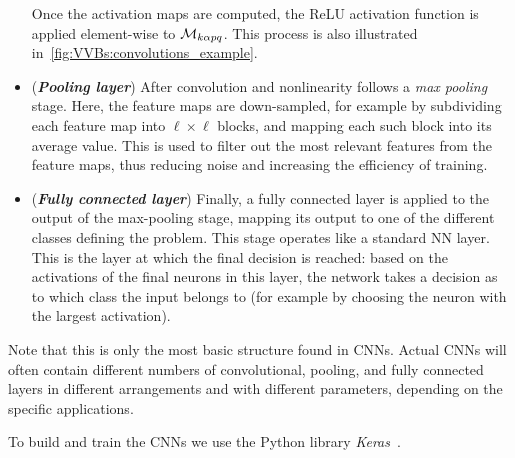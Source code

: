 \begin{itemize}
		Once the activation maps are computed, the ReLU activation function is applied element-wise to ${\mathcal{M}}_{k\alpha pq}$.
		This process is also illustrated in~\cref{fig:VVBs:convolutions_example}.
	\item (\textbf{\emph{Pooling layer}})
		After convolution and nonlinearity follows a \emph{max pooling} stage. Here, the feature maps are down-sampled, for example by subdividing each feature map into $\ell\times \ell$ blocks, and mapping each such block into its average value.
		This is used to filter out the most relevant features from the feature maps, thus reducing noise and increasing the efficiency of training.
	\item (\textbf{\emph{Fully connected layer}})
		Finally, a fully connected layer is applied to the output of the max-pooling stage, mapping its output to one of the different classes defining the problem.
		This stage operates like a standard NN layer.
		This is the layer at which the final decision is reached: based on the activations of the final neurons in this layer, the network takes a decision as to which class the input belongs to (for example by choosing the neuron with the largest activation).
\end{itemize}
Note that this is only the most basic structure found in CNNs. Actual CNNs will often contain different numbers of convolutional, pooling, and fully connected layers in different arrangements and with different parameters, depending on the specific applications.

To build and train the \acp{CNN} we use the Python library \emph{Keras}~\cite{chollet2015keras}.




